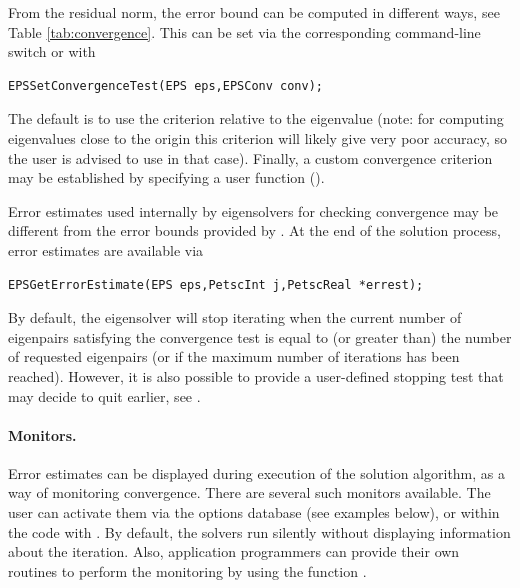 	From the residual norm, the error bound can be computed in different ways, see Table \ref{tab:convergence}. This can be set via the corresponding command-line switch or with
	\begin{Verbatim}[fontsize=\small]
	EPSSetConvergenceTest(EPS eps,EPSConv conv);
	\end{Verbatim}
The default is to use the criterion relative to the eigenvalue (note: for computing eigenvalues close to the origin this criterion will likely give very poor accuracy, so the user is advised to use  in that case). Finally, a custom convergence criterion may be established by specifying a user function ().

	Error estimates used internally by eigensolvers for checking convergence may be different from the error bounds provided by . At the end of the solution process, error estimates are available via
	\begin{Verbatim}[fontsize=\small]
	EPSGetErrorEstimate(EPS eps,PetscInt j,PetscReal *errest);
	\end{Verbatim}

	By default, the eigensolver will stop iterating when the current number of eigenpairs satisfying the convergence test is equal to (or greater than) the number of requested eigenpairs (or if the maximum number of iterations has been reached). However, it is also possible to provide a user-defined stopping test that may decide to quit earlier, see .

\paragraph{Monitors.}

	Error estimates can be displayed during execution of the solution algorithm, as a way of monitoring convergence. There are several such monitors available. The user can activate them via the options database (see examples below), or within the code with . By default, the solvers run silently without displaying information about the iteration. Also, application programmers can provide their own routines to perform the monitoring by using the function .

